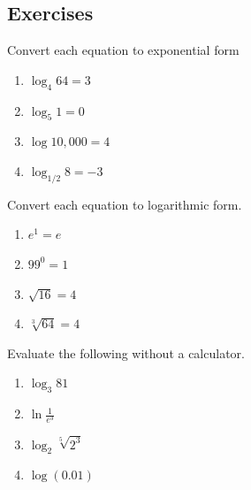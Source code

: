 \documentclass[10pt,]{book}
\theoremstyle{ptxdefinitionnotitle}
\theoremstyle{ptxdefinitiontitle}
\theoremstyle{ptxdefinitionnotitle}
\theoremstyle{ptxdefinitiontitle}
\theoremstyle{ptxdefinitionnotitle}
\theoremstyle{ptxdefinitiontitle}
\numberwithin{equation}{section}
\begin{document}
\subsection[{Exercises}]{Exercises}\label{exercises-12}
\begin{divisionexercise}{1}\hypertarget{exercise-75}{}
\hypertarget{p-299}{}%
Convert each equation to exponential form%
\leavevmode%
\begin{enumerate}[label=(\alph*)]
\item\hypertarget{li-180}{}\(\log_4 64 = 3\)%
\item\hypertarget{li-181}{}\(\log_5 1 = 0\)%
\item\hypertarget{li-182}{}\(\log 10,000 = 4\)%
\item\hypertarget{li-183}{}\(\log_{1/2} 8 = -3\)%
\end{enumerate}
\end{divisionexercise}%
\begin{divisionexercise}{2}\hypertarget{exercise-76}{}
\hypertarget{p-300}{}%
Convert each equation to logarithmic form.%
\leavevmode%
\begin{enumerate}[label=(\alph*)]
\item\hypertarget{li-184}{}\(e^1 = e\)%
\item\hypertarget{li-185}{}\(99^0 = 1\)%
\item\hypertarget{li-186}{}\(\sqrt{16} = 4\)%
\item\hypertarget{li-187}{}\(\sqrt[3]{64} = 4\)%
\end{enumerate}
\end{divisionexercise}%
\begin{divisionexercise}{3}\hypertarget{exercise-77}{}
\hypertarget{p-301}{}%
Evaluate the following without a calculator.%
\leavevmode%
\begin{enumerate}[label=(\alph*)]
\item\hypertarget{li-188}{}\(\log_3 81\)%
\item\hypertarget{li-189}{}\(\ln \frac{1}{e^3}\)%
\item\hypertarget{li-190}{}\(\log_2 \sqrt[5]{2^3}\)%
\item\hypertarget{li-191}{}\(\log \left( 0.01 \right)\)%
\end{enumerate}
\end{divisionexercise}%
\end{document}
